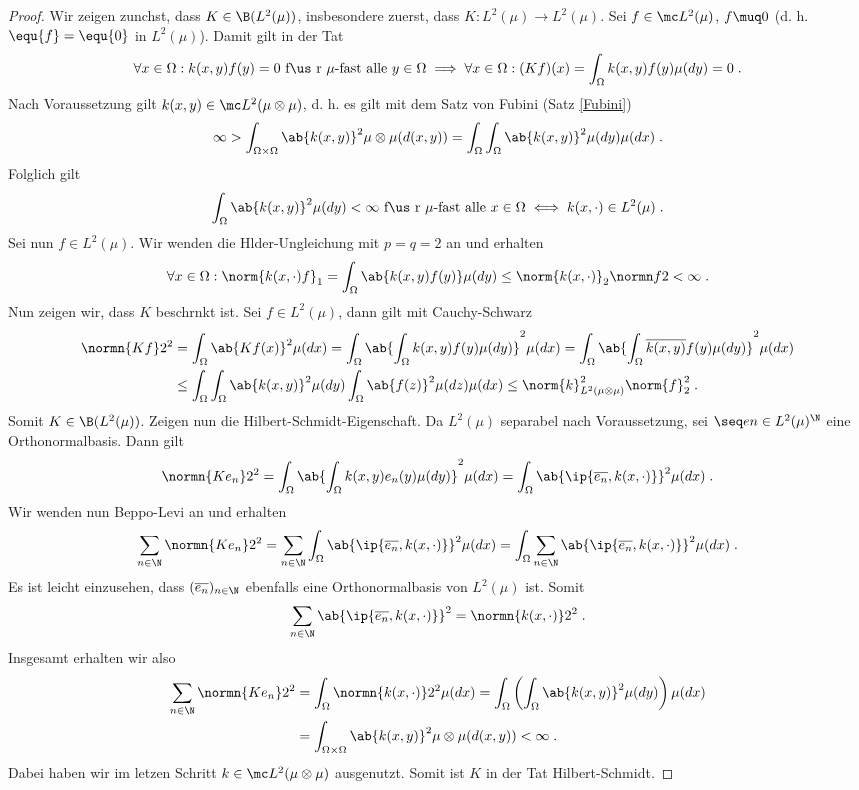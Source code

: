 \begin{proof}
	Wir zeigen zun\as chst, dass \(K\in \B(L^2(\mu))\), insbesondere zuerst, dass \(K: L^2(\mu) \to L^2(\mu)\). Sei \(f \in \mc L^2(\mu)\), \(f \muq 0\) (d. h. \(\equ{f} = \equ{0}\) in \(L^2(\mu)\)). Damit gilt in der Tat
	\[\forall x \in \Omega: k(x,y) f(y) = 0 \text{ f\us r $\mu$-fast alle }y\in \Omega \implies \forall x \in \Omega: (Kf)(x) = \int_\Omega k(x,y)f(y)\mu(dy) = 0\;.\]
	Nach Voraussetzung gilt \(k(x,y)\in \mc L^2(\mu\otimes \mu)\), d. h. es gilt mit dem Satz von Fubini (Satz \ref{Fubini})
	\[\infty >\int_{\Omega\times\Omega} \ab{k(x,y)}^2 \mu\otimes \mu(d(x,y)) = \int_\Omega \int_\Omega \ab{k(x,y)}^2\mu(dy)\mu(dx)\;.\]
	Folglich gilt 
	\[\int_\Omega \ab{k(x,y)}^2 \mu(dy) < \infty \text{ f\us r $\mu$-fast alle \(x\in\Omega\)} \iff k(x,\cdot) \in L^2(\mu)\;.\]
	Sei nun \(f\in L^2(\mu)\). Wir wenden die H\os lder-Ungleichung mit \(p = q = 2\) an und erhalten 
	\[\forall x\in \Omega: \norm{k(x,\cdot) f}_1 = \int_\Omega \ab{k(x,y) f(y)} \mu(dy)  \le \norm{k(x,\cdot)}_2 \normn f2 < \infty\;.\]
	Nun zeigen wir, dass $K$ beschr\as nkt ist. Sei \(f\in L^2(\mu)\), dann gilt mit Cauchy-Schwarz
	\begin{align*}
		\normn{Kf}2^2 &= \int_\Omega \ab{Kf(x)}^2 \mu(dx) = \int_\Omega \ab{\int_\Omega k(x,y) f(y) \mu(dy)}^2\mu(dx) = \int_\Omega \ab{\int_\Omega \overline{k(x,y)} f(y) \mu(dy)}^2\mu(dx) \\& \leq \int_\Omega\int_\Omega \ab{k(x,y)}^2\mu(dy) \int_\Omega \ab{f(z)}^2 \mu(dz) \mu(dx) \leq \norm{k}^2_{L^2(\mu\otimes\mu)}\norm{f}_2^2\;.
	\end{align*}
	Somit \(K\in\B(L^2(\mu))\). Zeigen nun die Hilbert-Schmidt-Eigenschaft. Da \(L^2(\mu)\) separabel nach Voraussetzung, sei \(\seq en \in L^2(\mu)^\N\) eine Orthonormalbasis. Dann gilt
	\[\normn{Ke_n}2^2 = \int_\Omega\ab{\int_\Omega k(x,y) e_n(y) \mu(dy)}^2 \mu(dx) = \int_\Omega\ab{\ip{\overline{e_n}, k(x,\cdot)}}^2 \mu(dx)\;.\]
	Wir wenden nun Beppo-Levi an und erhalten
	\[\sum_{n\in\N} \normn{Ke_n}2^2 = \sum_{n\in\N} \int_\Omega\ab{\ip{\overline{e_n}, k(x,\cdot)}}^2 \mu(dx) = \int_\Omega\sum_{n\in\N}\ab{\ip{\overline{e_n}, k(x,\cdot)}}^2\mu(dx)\;.\]
	Es ist leicht einzusehen, dass \((\overline{e_n})_{n\in\N}\) ebenfalls eine Orthonormalbasis von \(L^2(\mu)\) ist. Somit 
	\[\sum_{n\in\N}\ab{\ip{\overline{e_n}, k(x,\cdot)}}^2 = \normn{k(x,\cdot)}2^2\;.\]
	Insgesamt erhalten wir also 
	\begin{align*}
	\sum_{n\in\N} \normn{Ke_n}2^2  &= \int_\Omega \normn{k(x,\cdot)}2^2 \mu(dx) = \int_\Omega\left(\int_\Omega \ab{k(x,y)}^2 \mu(dy)\right)\mu(dx) \\
	&= \int_{\Omega \times \Omega}\ab{k(x,y)}^2 \mu\otimes\mu(d(x,y))<\infty\;.
	\end{align*}
	Dabei haben wir im letzen Schritt \(k\in \mc L^2(\mu\otimes \mu)\) ausgenutzt. Somit ist $K$ in der Tat Hilbert-Schmidt.
\end{proof}